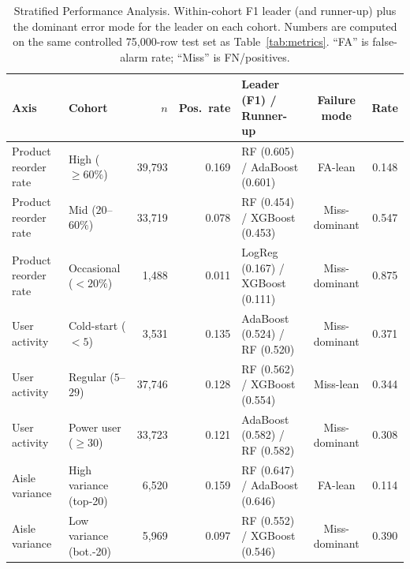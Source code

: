\documentclass[10pt,twocolumn]{article}
\begin{document}
\begin{table}[t]
\centering
\footnotesize
\setlength{\tabcolsep}{5pt}
\renewcommand{\arraystretch}{1.05}
\caption{Stratified Performance Analysis. Within-cohort F1 leader (and runner-up) plus the dominant error mode for the leader on each cohort. Numbers are computed on the same controlled 75{,}000-row test set as Table~\ref{tab:metrics}. ``FA'' is false-alarm rate; ``Miss'' is FN/positives.}
\label{tab:strat}
\begin{tabular}{l l r r l c c}
\toprule
\textbf{Axis} & \textbf{Cohort} & \textbf{$n$} & \textbf{Pos.\ rate} & \textbf{Leader (F1) / Runner-up} & \textbf{Failure mode} & \textbf{Rate} \\
\midrule
Product reorder rate & High ($\geq 60\%$)     & 39{,}793 & 0.169 & RF (0.605) / AdaBoost (0.601)     & FA-lean       & 0.148 \\
Product reorder rate & Mid ($20$--$60\%$)     & 33{,}719 & 0.078 & RF (0.454) / XGBoost (0.453)      & Miss-dominant & 0.547 \\
Product reorder rate & Occasional ($<20\%$)   &  1{,}488 & 0.011 & LogReg (0.167) / XGBoost (0.111)  & Miss-dominant & 0.875 \\
\midrule
User activity        & Cold-start ($<5$)      &  3{,}531 & 0.135 & AdaBoost (0.524) / RF (0.520)     & Miss-dominant & 0.371 \\
User activity        & Regular ($5$--$29$)    & 37{,}746 & 0.128 & RF (0.562) / XGBoost (0.554)      & Miss-lean     & 0.344 \\
User activity        & Power user ($\geq 30$) & 33{,}723 & 0.121 & AdaBoost (0.582) / RF (0.582)     & Miss-dominant & 0.308 \\
\midrule
Aisle variance       & High variance (top-20) &  6{,}520 & 0.159 & RF (0.647) / AdaBoost (0.646)     & FA-lean       & 0.114 \\
Aisle variance       & Low variance (bot.-20) &  5{,}969 & 0.097 & RF (0.552) / XGBoost (0.546)      & Miss-dominant & 0.390 \\
\bottomrule
\end{tabular}
\end{table}
\end{document}
